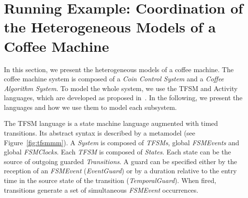 \section{Running Example: Coordination of the Heterogeneous Models of a Coffee Machine}
\label{sec:runningexample}
In this section, we present the heterogeneous models of a coffee machine. The coffee machine system is composed of a \emph{Coin Control System} and a \emph{Coffee Algorithm System}. To model the whole system, we use the TFSM and Activity languages, which are developed as proposed in~\cite{sle13-combemale}. In the following, we present the languages and how we use them to model each subsystem. %


The TFSM language is a state machine language augmented with timed transitions. Its abstract syntax is described by a metamodel (see Figure~\ref{fig:tfsmmm}). A \emph{System} is composed of \emph{TFSMs}, global \emph{FSMEvents} and global \emph{FSMClocks}. Each \emph{TFSM} is composed of \emph{States}. Each state can be the source of outgoing guarded \emph{Transitions}. A guard can be specified either by the reception of an \emph{FSMEvent} (\emph{EventGuard}) or by a duration relative to the entry time in the source state of the transition (\emph{TemporalGuard}). When fired, transitions generate a set of simultaneous \emph{FSMEvent} occurrences.
	
